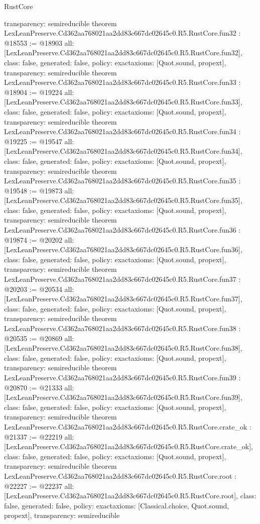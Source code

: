 \begin{lexlean}{RustCore}
\begin{coremodule}
{  transparency: semireducible
}
theorem LexLeanPreserve.Cd362aa768021aa2dd83c667dc02645c0.R5.RustCore.fun32 : @18553 := @18903 {
  all: [LexLeanPreserve.Cd362aa768021aa2dd83c667dc02645c0.R5.RustCore.fun32],
  class: false,
  generated: false,
  policy: exact{axioms: [Quot.sound, propext]},
  transparency: semireducible
}
theorem LexLeanPreserve.Cd362aa768021aa2dd83c667dc02645c0.R5.RustCore.fun33 : @18904 := @19224 {
  all: [LexLeanPreserve.Cd362aa768021aa2dd83c667dc02645c0.R5.RustCore.fun33],
  class: false,
  generated: false,
  policy: exact{axioms: [Quot.sound, propext]},
  transparency: semireducible
}
theorem LexLeanPreserve.Cd362aa768021aa2dd83c667dc02645c0.R5.RustCore.fun34 : @19225 := @19547 {
  all: [LexLeanPreserve.Cd362aa768021aa2dd83c667dc02645c0.R5.RustCore.fun34],
  class: false,
  generated: false,
  policy: exact{axioms: [Quot.sound, propext]},
  transparency: semireducible
}
theorem LexLeanPreserve.Cd362aa768021aa2dd83c667dc02645c0.R5.RustCore.fun35 : @19548 := @19873 {
  all: [LexLeanPreserve.Cd362aa768021aa2dd83c667dc02645c0.R5.RustCore.fun35],
  class: false,
  generated: false,
  policy: exact{axioms: [Quot.sound, propext]},
  transparency: semireducible
}
theorem LexLeanPreserve.Cd362aa768021aa2dd83c667dc02645c0.R5.RustCore.fun36 : @19874 := @20202 {
  all: [LexLeanPreserve.Cd362aa768021aa2dd83c667dc02645c0.R5.RustCore.fun36],
  class: false,
  generated: false,
  policy: exact{axioms: [Quot.sound, propext]},
  transparency: semireducible
}
theorem LexLeanPreserve.Cd362aa768021aa2dd83c667dc02645c0.R5.RustCore.fun37 : @20203 := @20534 {
  all: [LexLeanPreserve.Cd362aa768021aa2dd83c667dc02645c0.R5.RustCore.fun37],
  class: false,
  generated: false,
  policy: exact{axioms: [Quot.sound, propext]},
  transparency: semireducible
}
theorem LexLeanPreserve.Cd362aa768021aa2dd83c667dc02645c0.R5.RustCore.fun38 : @20535 := @20869 {
  all: [LexLeanPreserve.Cd362aa768021aa2dd83c667dc02645c0.R5.RustCore.fun38],
  class: false,
  generated: false,
  policy: exact{axioms: [Quot.sound, propext]},
  transparency: semireducible
}
theorem LexLeanPreserve.Cd362aa768021aa2dd83c667dc02645c0.R5.RustCore.fun39 : @20870 := @21333 {
  all: [LexLeanPreserve.Cd362aa768021aa2dd83c667dc02645c0.R5.RustCore.fun39],
  class: false,
  generated: false,
  policy: exact{axioms: [Quot.sound, propext]},
  transparency: semireducible
}
theorem LexLeanPreserve.Cd362aa768021aa2dd83c667dc02645c0.R5.RustCore.crate_ok : @21337 := @22219 {
  all: [LexLeanPreserve.Cd362aa768021aa2dd83c667dc02645c0.R5.RustCore.crate_ok],
  class: false,
  generated: false,
  policy: exact{axioms: [Quot.sound, propext]},
  transparency: semireducible
}
theorem LexLeanPreserve.Cd362aa768021aa2dd83c667dc02645c0.R5.RustCore.root : @22227 := @22237 {
  all: [LexLeanPreserve.Cd362aa768021aa2dd83c667dc02645c0.R5.RustCore.root],
  class: false,
  generated: false,
  policy: exact{axioms: [Classical.choice, Quot.sound, propext]},
  transparency: semireducible
}


\end{coremodule}
\end{lexlean}
